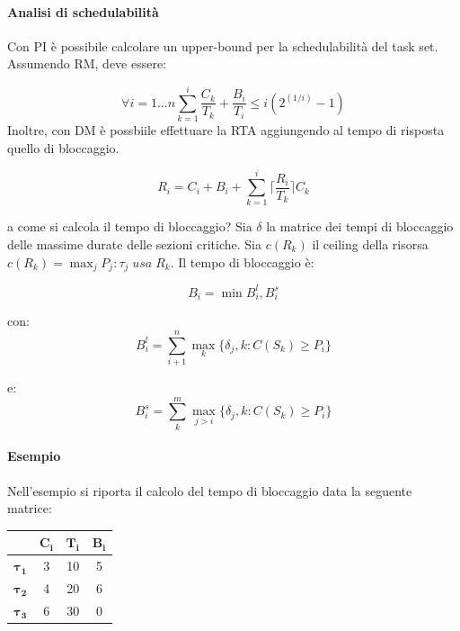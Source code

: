 \documentclass[11pt,a4paper]{report}
\begin{document}
\paragraph{Analisi di schedulabilità}
Con PI è possibile calcolare un upper-bound per la schedulabilità del task set.
Assumendo RM, deve essere:

\begin{equation}
    \forall i = 1...n \sum_{k=1}^i\frac{C_k}{T_k} + \frac{B_i}{T_i} \leq i(2^{(1/i)} - 1)
\end{equation}
Inoltre, con DM è possbiile effettuare la RTA aggiungendo al tempo di risposta quello di bloccaggio.

\begin{equation}
    R_i = C_i + B_i + \sum_{k=1}^i\lceil\frac{R_i}{T_k}\rceil C_k
\end{equation}

a come si calcola il tempo di bloccaggio? Sia $\delta$ la matrice dei tempi di bloccaggio delle massime durate delle sezioni critiche. Sia $c(R_k)$ il ceiling della risorsa $c(R_k) = \max_j{P_j : \tau_j\; usa\; R_k}$. Il tempo di bloccaggio è:

\begin{equation}
    B_i = \min{B_i^l, B_i^s}
\end{equation}

con:
\begin{equation}
    B_i^l =\sum_{i+1}^n \max_k\{\delta_j,k: C(S_k) \geq P_i\}
\end{equation}

e:
\begin{equation}
    B_i^s =\sum_{k}^m \max_{j>i}\{\delta_j,k: C(S_k) \geq P_i\}
\end{equation}

\paragraph{Esempio}
Nell'esempio si riporta il calcolo del tempo di bloccaggio data la seguente matrice:

\begin{center}
\renewcommand{\arraystretch}{1.3}
\begin{tabular}{|c|c|c|c|}
\hline
 & $\boldsymbol{C_i}$ & $\boldsymbol{T_i}$ & $\boldsymbol{B_i}$ \\ \hline
$\boldsymbol{\tau_1}$ & 3 & 10 & 5 \\ \hline
$\boldsymbol{\tau_2}$ & 4 & 20 & 6 \\ \hline
$\boldsymbol{\tau_3}$ & 6 & 30 & 0 \\ \hline
\end{tabular}
\end{center}
\end{document}
